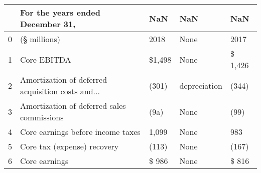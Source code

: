 \begin{tabular}{lllll}
\toprule
{} &                   For the years ended December 31, &     NaN &           NaN &      NaN \\
\midrule
0 &                                       (§ millions) &    2018 &          None &     2017 \\
1 &                                        Core EBITDA &  \$1,498 &          None &  \$ 1,426 \\
2 &  Amortization of deferred acquisition costs and... &   (301) &  depreciation &    (344) \\
3 &         Amortization of deferred sales commissions &    (9a) &          None &     (99) \\
4 &                  Core earnings before income taxes &   1,099 &          None &      983 \\
5 &                        Core tax (expense) recovery &   (113) &          None &    (167) \\
6 &                                      Core earnings &   \$ 986 &          None &    \$ 816 \\
\bottomrule
\end{tabular}
